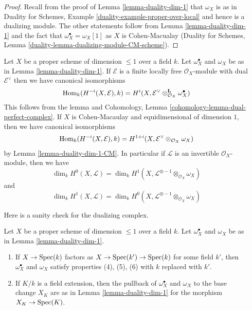 \begin{proof}
Recall from the proof of Lemma \ref{lemma-duality-dim-1}
that $\omega_X$ is as in Duality for Schemes, Example
\ref{duality-example-proper-over-local} and hence is
a dualizing module. The other statements follow from
Lemma \ref{lemma-duality-dim-1}
and the fact that $\omega_X^\bullet = \omega_X[1]$
as $X$ is Cohen-Macualay (Duality for Schemes, Lemma
\ref{duality-lemma-dualizing-module-CM-scheme}).
\end{proof}

\begin{remark}
\label{remark-rework-duality-locally-free}
Let $X$ be a proper scheme of dimension $\leq 1$ over a field $k$.
Let $\omega_X^\bullet$ and $\omega_X$ be as in Lemma \ref{lemma-duality-dim-1}.
If $\mathcal{E}$ is a finite locally free $\mathcal{O}_X$-module
with dual $\mathcal{E}^\vee$ then we have canonical isomorphisms
$$
\mathop{\mathrm{Hom}}\nolimits_k(H^{-i}(X, \mathcal{E}), k) =
H^i(X, \mathcal{E}^\vee \otimes_{\mathcal{O}_X}^\mathbf{L} \omega_X^\bullet)
$$
This follows from the lemma and
Cohomology, Lemma \ref{cohomology-lemma-dual-perfect-complex}.
If $X$ is Cohen-Macaulay and equidimensional of dimension $1$, then
we have canonical isomorphisms
$$
\mathop{\mathrm{Hom}}\nolimits_k(H^{-i}(X, \mathcal{E}), k) =
H^{1 + i}(X, \mathcal{E}^\vee \otimes_{\mathcal{O}_X} \omega_X)
$$
by Lemma \ref{lemma-duality-dim-1-CM}. In particular
if $\mathcal{L}$ is an invertible $\mathcal{O}_X$-module, then we have
$$
\dim_k H^0(X, \mathcal{L}) =
\dim_k H^1(X, \mathcal{L}^{\otimes -1} \otimes_{\mathcal{O}_X} \omega_X)
$$
and
$$
\dim_k H^1(X, \mathcal{L}) =
\dim_k H^0(X, \mathcal{L}^{\otimes -1} \otimes_{\mathcal{O}_X} \omega_X)
$$
\end{remark}

\noindent
Here is a sanity check for the dualizing complex.

\begin{lemma}
\label{lemma-sanity-check-duality}
Let $X$ be a proper scheme of dimension $\leq 1$ over a field $k$.
Let $\omega_X^\bullet$ and $\omega_X$ be as in Lemma \ref{lemma-duality-dim-1}.
\begin{enumerate}
\item If $X \to \mathop{\mathrm{Spec}}(k)$ factors as $X \to \mathop{\mathrm{Spec}}(k') \to \mathop{\mathrm{Spec}}(k)$
for some field $k'$, then $\omega_X^\bullet$ and $\omega_X$
satisfy properties (4), (5), (6) with $k$ replaced with $k'$.
\item If $K/k$ is a field extension, then the pullback of
$\omega_X^\bullet$ and $\omega_X$ to the base change $X_K$
are as in  Lemma \ref{lemma-duality-dim-1} for the morphism
$X_K \to \mathop{\mathrm{Spec}}(K)$.
\end{enumerate}
\end{lemma}

